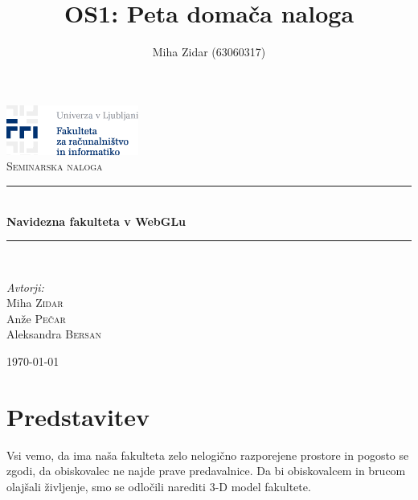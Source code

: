 \documentclass[10pt,a4paper]{article}
\author{Miha Zidar (63060317)}
\title{OS1: Peta domača naloga}
\begin{document}
\begin{titlepage}
\begin{center}

\includegraphics{Screenshot.png}\\[4.0cm]    
\textsc{\Large Seminarska naloga}\\[4.5cm]

\hrule \ \\[0.2cm]
{ \huge \bfseries Navidezna fakulteta v WebGLu}\\[0.3cm]
\hrule \ \\[4.5cm]

\begin{minipage}{0.4\textwidth}
\begin{flushleft} \large
\emph{Avtorji:}\\
Miha \textsc{Zidar}\\
Anže \textsc{Pečar}\\
Aleksandra \textsc{Bersan}\\
\end{flushleft}
\end{minipage}
\begin{minipage}{0.4\textwidth}
\begin{flushright} \large
\end{flushright}
\end{minipage}
\vfill

{\large \today}

\end{center}
\end{titlepage}
\pagebreak
\section{Predstavitev}
Vsi vemo, da ima naša fakulteta zelo nelogično razporejene prostore in pogosto se zgodi, da obiskovalec ne najde prave predavalnice. Da bi obiskovalcem in brucom olajšali življenje,
smo se odločili narediti 3-D model fakultete.
\end{document}

